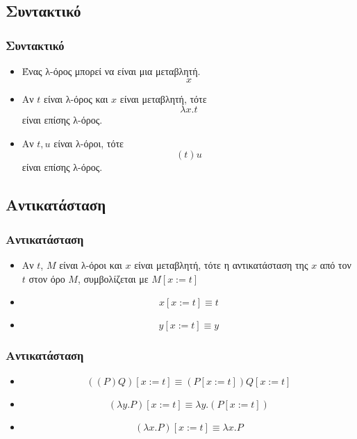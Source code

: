 \documentclass{beamer}
\begin{document}
\subsection{Συντακτικό}

\begin{frame}
        \frametitle{Συντακτικό}
        \begin{itemize}
                \item Ένας λ-όρος μπορεί να είναι μια μεταβλητή.$$x$$
                \pause
                \item Αν $t$ είναι λ-όρος και $x$ είναι μεταβλητή, τότε $$\lambda x.t$$
                είναι επίσης λ-όρος.
                \pause
                \item Αν $t, u$ είναι λ-όροι, τότε $$(t)u$$
                είναι επίσης λ-όρος.
        \end{itemize}
\end{frame}

\subsection{Αντικατάσταση}

\begin{frame}
        \frametitle{Αντικατάσταση}
        \begin{itemize}
        	\item Αν $t$, $M$ είναι λ-όροι και $x$ είναι μεταβλητή, τότε η αντικατάσταση της $x$
            από τον $t$ στον όρο $M$, συμβολίζεται με $M[x:=t]$ \\
            \pause
            \item $$x[x:=t] \equiv t$$
            \pause
            \item $$y[x:=t] \equiv y$$
                                    
        \end{itemize}
\end{frame}

\begin{frame}
        \frametitle{Αντικατάσταση}
        \begin{itemize}
        	
            \item $$((P)Q)[x:=t] \equiv (P[x:=t])Q[x:=t]$$
            \pause
            \item $$(\lambda y . P)[x:=t] \equiv \lambda y . (P[x:=t])$$
            \pause
            \item $$(\lambda x . P)[x:=t] \equiv \lambda x . P$$
            
        \end{itemize}
\end{frame}
\end{document}
